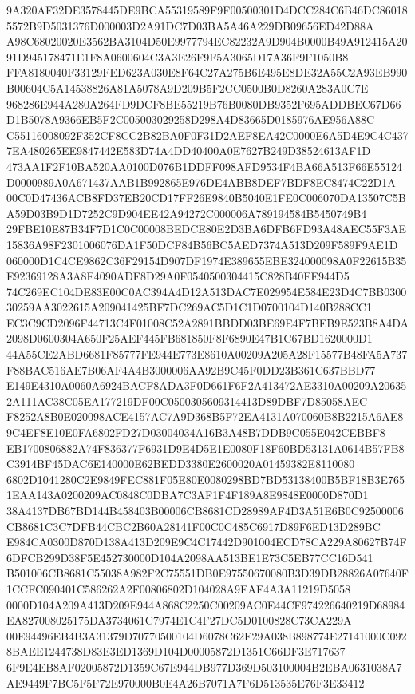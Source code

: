 \documentclass[UTF8,fontset=fandol,zihao=-4,a4paper]{ctexart}
\begin{document}
{{9A320AF32DE3578445DE9BCA55319589F9F00500301D4DCC284C6B46DC860185572B9D5031376D000003D2A91DC7D03BA5A46A229DB09656ED42D88A
A98C68020020E3562BA3104D50E9977794EC82232A9D904B0000B49A912415A2091D945178471E1F8A0600604C3A3E26F9F5A3065D17A36F9F1050B8
FFA8180040F33129FED623A030E8F64C27A275B6E495E8DE32A55C2A93EB990B00604C5A14538826A81A5078A9D209B5F2CC0500B0D8260A283A0C7E
968286E944A280A264FD9DCF8BE55219B76B0080DB9352F695ADDBEC67D66D1B5078A9366EB5F2C005003029258D298A4D83665D0185976AE956A88C
C55116008092F352CF8CC2B82BA0F0F31D2AEF8EA42C0000E6A5D4E9C4C4377EA480265EE9847442E583D74A4DD40400A0E7627B249D38524613AF1D
473AA1F2F10BA520AA0100D076B1DDFF098AFD9534F4BA66A513F66E55124D0000989A0A671437AAB1B992865E976DE4ABB8DEF7BDF8EC8474C22D1A
00C0D47436ACB8FD37EB20CD17FF26E9840B5040E1FE0C006070DA13507C5BA59D03B9D1D7252C9D904EE42A94272C000006A789194584B5450749B4
29FBE10E87B34F7D1C0C00008BEDCE80E2D3BA6DFB6FD93A48AEC55F3AE15836A98F2301006076DA1F50DCF84B56BC5AED7374A513D209F589F9AE1D
060000D1C4CE9862C36F29154D907DF1974E389655EBE324000098A0F22615B35E92369128A3A8F4090ADF8D29A0F0540500304415C828B40FE944D5
74C269EC104DE83E00C0AC394A4D12A513DAC7E029954E584E23D4C7BB030030259AA3022615A209041425BF7DC269AC5D1C1D0700104D140B288CC1
EC3C9CD2096F44713C4F01008C52A2891BBDD03BE69E4F7BEB9E523B8A4DA2098D0600304A650F25AEF445FB681850F8F6890E47B1C67BD1620000D1
44A55CE2ABD6681F85777FE944E773E8610A00209A205A28F15577B48FA5A737F88BAC516AE7B06AF4A4B3000006AA92B9C45F0DD23B361C637BBD77
E149E4310A0060A6924BACF8ADA3F0D661F6F2A413472AE3310A00209A206352A111AC38C05EA177219DF00C0500305609314413D89DBF7D85058AEC
F8252A8B0E020098ACE4157AC7A9D368B5F72EA4131A070060B8B2215A6AE89C4EF8E10E0FA6802FD27D03004034A16B3A48B7DDB9C055E042CEBBF8
EB1700806882A74F836377F6931D9E4D5E1E0080F18F60BD53131A0614B57FB8C3914BF45DAC6E140000E62BEDD3380E2600020A01459382E8110080
6802D1041280C2E9849FEC881F05E80E0080298BD7BD53138400B5BF18B3E7651EAA143A0200209AC0848C0DBA7C3AF1F4F189A8E9848E0000D870D1
38A4137DB67BD144B458403B00006CB8681CD28989AF4D3A51E6B0C92500006CB8681C3C7DFB44CBC2B60A28141F00C0C485C6917D89F6ED13D289BC
E984CA0300D870D138A413D209E9C4C17442D901004ECD78CA229A80627B74F6DFCB299D38F5E452730000D104A2098AA513BE1E73C5EB77CC16D541
B501006CB8681C55038A982F2C75551DB0E97550670080B3D39DB28826A07640F1CCFC090401C586262A2F00806802D104028A9EAF4A3A11219D5058
0000D104A209A413D209E944A868C2250C00209AC0E44CF974226640219D68984EA827008025175DA3734061C7974E1C4F27DC5D0100828C73CA229A
00E94496EB4B3A31379D70770500104D6078C62E29A038B898774E27141000C0928BAEE1244738D83E3ED1369D104D00005872D1351C66DF3E717637
6F9E4EB8AF02005872D1359C67E944DB977D369D503100004B2EBA0631038A7AE9449F7BC5F5F72E970000B0E4A26B7071A7F6D513535E76F3E33412
}}
\end{document}
